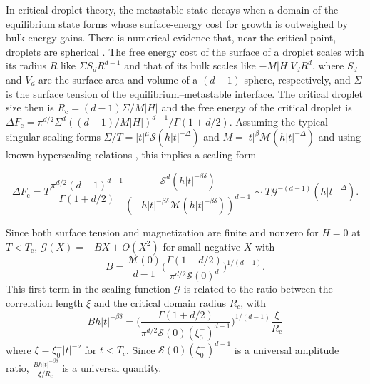 \documentclass[aps,prl,reprint]{revtex4-1}
\def\[{\begin{equation}}
\def\]{\end{equation}}
\def\O{O}          %
\def\c{\mathrm c}
\def\fM{\mathcal M}  %
\def\fS{\mathcal S}  %
\def\fG{\mathcal G}  %
\def\dim{d}
\newif\ifreprint
\begin{document}
In critical droplet theory, the metastable state decays when a domain of the
equilibrium state forms whose surface-energy cost for growth is outweighed by
bulk-energy gains. There is numerical evidence that, near the critical point, droplets are spherical \cite{gunther.1993.transfer-matrix}. The free energy cost of the surface of a droplet
scales with its radius $R$ like $\Sigma S_\dim R^{\dim-1}$ and that of its
bulk scales like $-M|H|V_\dim R^\dim$, where $S_\dim$ and $V_\dim$ are the surface area and
volume of a $(\dim-1)$-sphere, respectively, and $\Sigma$ is the surface tension of the equilibrium--metastable interface. The critical droplet size then is
$R_\c=(\dim-1)\Sigma/M|H|$ and the free energy of the critical
droplet is $\Delta
F_\c=\pi^{\dim/2}\Sigma^\dim((\dim-1)/M|H|)^{\dim-1}/\Gamma(1+\dim/2)$.  
Assuming the typical singular scaling forms
$\Sigma/T=|t|^\mu\fS(h|t|^{-\Delta})$ and $M=|t|^\beta\mathcal
M(h|t|^{-\Delta})$ and using known hyperscaling relations
\cite{widom.1981.interface}, this implies a scaling form
\def\eqcritformone{
  T\frac{\pi^{\dim/2}(\dim-1)^{\dim-1}}{\Gamma(1+\dim/2)}\frac{\fS^\dim(h|t|^{-\beta\delta})}{(-h|t|^{-\beta\delta}\fM(h|t|^{-\beta\delta}))^{\dim-1}}
}
\def\eqcritformtwo{
  T\fG^{-(\dim-1)}(h|t|^{-\Delta})
}
\ifreprint
\[
  \begin{aligned}
    \Delta F_\c
    &=\eqcritformone\\
    &\sim\eqcritformtwo.
  \end{aligned}
\]
\else
\[
  \Delta F_\c=\eqcritformone\sim\eqcritformtwo.
\]
\fi
Since both surface tension and magnetization are finite and nonzero for $H=0$
at $T<T_\c$, $\fG(X)=-BX+\O(X^2)$ for small negative $X$ with
\[
  B=\frac{\fM(0)}{\dim-1}\bigg(\frac{\Gamma(1+\dim/2)}{\pi^{\dim/2}\fS(0)^\dim}\bigg)^{1/(\dim-1)}.
\]
This first term in the scaling function $\fG$ is related to the ratio between the correlation length $\xi$
and the critical domain radius $R_c$, with
\[
  Bh|t|^{-\beta\delta}=\bigg(\frac{\Gamma(1+\dim/2)}{\pi^{\dim/2}\fS(0)(\xi_0^-)^{\dim-1}}\bigg)^{1/(\dim-1)}\frac\xi{R_\c}
\]
where $\xi=\xi_0^-|t|^{-\nu}$ for $t<T_c$. Since $\fS(0)(\xi_0^-)^{\dim-1}$ is a
universal amplitude ratio, $\frac{Bh|t|^{-\beta\delta}}{\xi/R_c}$ is a
universal quantity.
\end{document}
